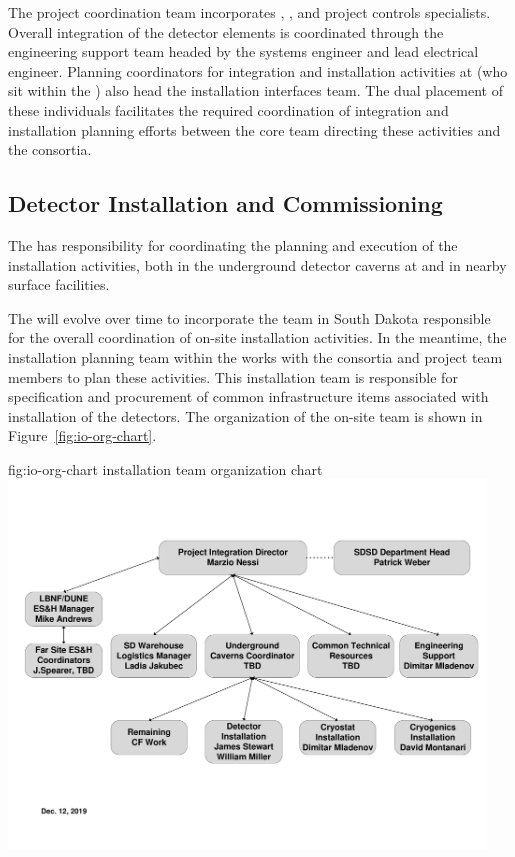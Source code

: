 The  project coordination team incorporates , 
, and project controls specialists.  Overall integration 
of the detector elements is coordinated through the  
engineering support team headed by the  systems 
engineer and lead  electrical engineer.  Planning 
coordinators for integration and installation activities at 
 (who sit within the  ) also head the  installation interfaces team.  
The dual placement of these individuals facilitates the required 
coordination of integration and installation planning efforts between 
the core team directing these activities and the  
consortia. %

\subsection{Detector Installation and Commissioning}  %
\label{sec:es-tc-det-instal}

The  has
responsibility for coordinating the planning and execution of 
the  installation activities, both 
in the underground detector caverns at  and in 
nearby surface facilities. 

The   will evolve over 
time to incorporate the team in South Dakota responsible for the 
overall coordination of on-site installation activities.  In the 
meantime, the installation planning team within the  works with 
the  consortia and  project team members 
to plan these activities.  This installation team is responsible for specification 
and procurement of common infrastructure items associated with 
installation of the detectors. 
The organization of the on-site team is 
shown in Figure~\ref{fig:io-org-chart}. 

\begin{dunefigure}{fig:io-org-chart}
  { installation team organization chart}
  \includegraphics[width=0.95\textwidth]{graphics/org-farsite-io.pdf}
\end{dunefigure}


